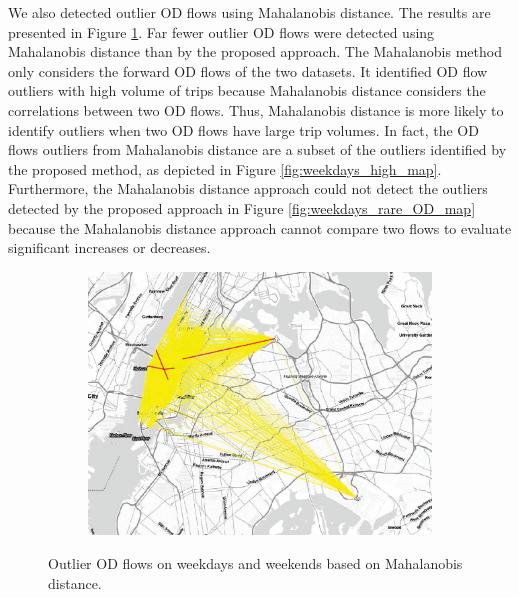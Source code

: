 \documentclass[a4paper,UKenglish]{lipics-v2018}
\providecommand{\DIFdelbegin}{} %
\providecommand{\DIFdelend}{} %
\begin{document}
We also detected outlier OD flows using Mahalanobis distance.
The results are presented in Figure \ref{fig:week_ends_MD}. 
Far fewer outlier OD flows were detected using Mahalanobis distance than by the proposed approach.
The Mahalanobis method only considers the forward OD flows of the two datasets.
It identified OD flow outliers with high volume of trips because Mahalanobis distance considers the correlations between two OD flows.
Thus, Mahalanobis distance is more likely to identify outliers when two OD flows have large trip volumes.
In fact, the OD flows outliers from Mahalanobis distance are a subset of the outliers identified by the proposed method, as depicted in Figure \ref{fig:weekdays_high_map}.
Furthermore, the Mahalanobis distance approach could not detect the outliers detected by the proposed approach in Figure \ref{fig:weekdays_rare_OD_map} because the Mahalanobis distance approach cannot compare two flows to evaluate significant increases or decreases.


\DIFdelbegin %

\DIFdelend \begin{figure}
	\centering
	\begin{subfigure}[b]{0.49\textwidth}
		\includegraphics[width=\textwidth]{images/out_weekdays_weekends_md2_outlier.eps}
	\end{subfigure}
	\caption{Outlier OD flows on weekdays and weekends based on Mahalanobis distance. }\label{fig:week_ends_MD}	
\end{figure}
\end{document}
